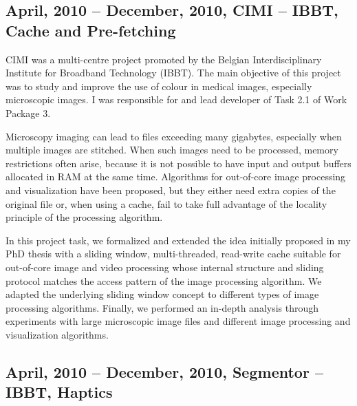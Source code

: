 \documentclass[a4paper]{article}
\begin{document}
\renewcommand{\refname}{Related publications}
\begin{bibunit}[unsrt]
\nocite{Pinho:Trachea4}
\nocite{Pinho:Trachea5}
\nocite{Pinho:Trachea6}
\nocite{Pinho:Airways2}
\nocite{Pinho:Trachea3}
\nocite{Pinho:Trachea2}
\nocite{Pinho:Trachea1}
\nocite{Pinho:Airways1}
\putbib[mybib]
\end{bibunit}

\subsection{April, 2010 -- December, 2010, CIMI -- IBBT, Cache and Pre-fetching}

CIMI was a multi-centre project promoted by the Belgian Interdisciplinary Institute for Broadband Technology (IBBT). The main objective of this project was to study and improve the use of colour in medical images, especially microscopic images. I was responsible for and lead developer of Task 2.1 of Work Package 3.

Microscopy imaging can lead to files exceeding many gigabytes, especially when multiple images
are stitched. When such images need to be processed, memory restrictions often arise, because it
is not possible to have input and output buffers allocated in RAM at the same time. Algorithms for
out-of-core image processing and visualization have been proposed, but they either need extra
copies of the original file or, when using a cache, fail to take full advantage of the locality principle of the processing algorithm. 

In this project task, we formalized and extended the idea initially proposed in my PhD thesis with a sliding window, multi-threaded, read-write cache suitable for out-of-core image and video processing whose internal structure and sliding protocol matches the access pattern of the image processing algorithm. We adapted the underlying sliding window concept to different types of image processing algorithms. Finally, we performed an in-depth analysis through experiments with large microscopic image files and different image processing and visualization algorithms.

\renewcommand{\refname}{Related publications}
\begin{bibunit}[unsrt]
\nocite{Pinho:Cache1}
\putbib[mybib]
\end{bibunit}

\subsection{April, 2010 -- December, 2010, Segmentor -- IBBT, Haptics}
\end{document}
